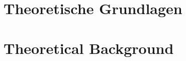 \ifnum{}
  \chapter{Theoretische Grundlagen}
\else
  \chapter{Theoretical Background}
\fi
\label{ch:theorie}

